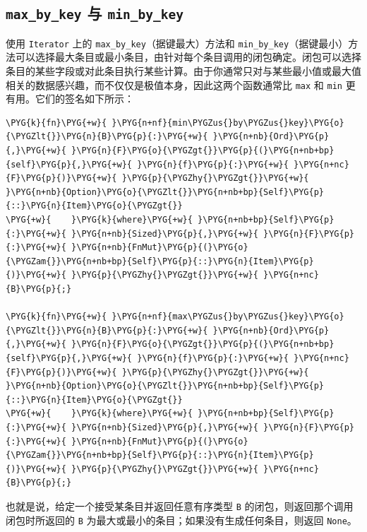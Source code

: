 \subsection{\texttt{max\_by\_key} 与 \texttt{min\_by\_key}}

使用 \texttt{Iterator} 上的 \texttt{max\_by\_key}（据键最大）方法和 \texttt{min\_by\_key}（据键最小）方法可以选择最大条目或最小条目，由针对每个条目调用的闭包确定。闭包可以选择条目的某些字段或对此条目执行某些计算。由于你通常只对与某些最小值或最大值相关的数据感兴趣，而不仅仅是极值本身，因此这两个函数通常比 \texttt{max} 和 \texttt{min} 更有用。它们的签名如下所示：

\begin{Verbatim}[commandchars=\\\{\},breaklines=true,breakanywhere=true,fontsize=\codefont,xleftmargin=17bp]
\PYG{k}{fn}\PYG{+w}{ }\PYG{n+nf}{min\PYGZus{}by\PYGZus{}key}\PYG{o}{\PYGZlt{}}\PYG{n}{B}\PYG{p}{:}\PYG{+w}{ }\PYG{n+nb}{Ord}\PYG{p}{,}\PYG{+w}{ }\PYG{n}{F}\PYG{o}{\PYGZgt{}}\PYG{p}{(}\PYG{n+nb+bp}{self}\PYG{p}{,}\PYG{+w}{ }\PYG{n}{f}\PYG{p}{:}\PYG{+w}{ }\PYG{n+nc}{F}\PYG{p}{)}\PYG{+w}{ }\PYG{p}{\PYGZhy{}\PYGZgt{}}\PYG{+w}{ }\PYG{n+nb}{Option}\PYG{o}{\PYGZlt{}}\PYG{n+nb+bp}{Self}\PYG{p}{::}\PYG{n}{Item}\PYG{o}{\PYGZgt{}}
\PYG{+w}{    }\PYG{k}{where}\PYG{+w}{ }\PYG{n+nb+bp}{Self}\PYG{p}{:}\PYG{+w}{ }\PYG{n+nb}{Sized}\PYG{p}{,}\PYG{+w}{ }\PYG{n}{F}\PYG{p}{:}\PYG{+w}{ }\PYG{n+nb}{FnMut}\PYG{p}{(}\PYG{o}{\PYGZam{}}\PYG{n+nb+bp}{Self}\PYG{p}{::}\PYG{n}{Item}\PYG{p}{)}\PYG{+w}{ }\PYG{p}{\PYGZhy{}\PYGZgt{}}\PYG{+w}{ }\PYG{n+nc}{B}\PYG{p}{;}

\PYG{k}{fn}\PYG{+w}{ }\PYG{n+nf}{max\PYGZus{}by\PYGZus{}key}\PYG{o}{\PYGZlt{}}\PYG{n}{B}\PYG{p}{:}\PYG{+w}{ }\PYG{n+nb}{Ord}\PYG{p}{,}\PYG{+w}{ }\PYG{n}{F}\PYG{o}{\PYGZgt{}}\PYG{p}{(}\PYG{n+nb+bp}{self}\PYG{p}{,}\PYG{+w}{ }\PYG{n}{f}\PYG{p}{:}\PYG{+w}{ }\PYG{n+nc}{F}\PYG{p}{)}\PYG{+w}{ }\PYG{p}{\PYGZhy{}\PYGZgt{}}\PYG{+w}{ }\PYG{n+nb}{Option}\PYG{o}{\PYGZlt{}}\PYG{n+nb+bp}{Self}\PYG{p}{::}\PYG{n}{Item}\PYG{o}{\PYGZgt{}}
\PYG{+w}{    }\PYG{k}{where}\PYG{+w}{ }\PYG{n+nb+bp}{Self}\PYG{p}{:}\PYG{+w}{ }\PYG{n+nb}{Sized}\PYG{p}{,}\PYG{+w}{ }\PYG{n}{F}\PYG{p}{:}\PYG{+w}{ }\PYG{n+nb}{FnMut}\PYG{p}{(}\PYG{o}{\PYGZam{}}\PYG{n+nb+bp}{Self}\PYG{p}{::}\PYG{n}{Item}\PYG{p}{)}\PYG{+w}{ }\PYG{p}{\PYGZhy{}\PYGZgt{}}\PYG{+w}{ }\PYG{n+nc}{B}\PYG{p}{;}
\end{Verbatim}

也就是说，给定一个接受某条目并返回任意有序类型 \texttt{B} 的闭包，则返回那个调用闭包时所返回的 \texttt{B} 为最大或最小的条目；如果没有生成任何条目，则返回 \texttt{None}。

